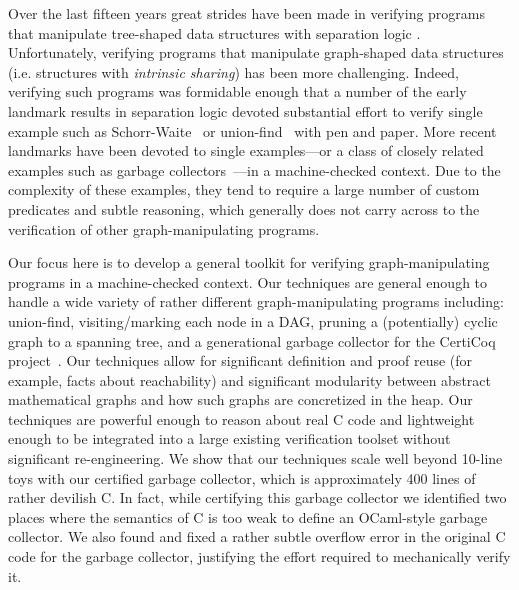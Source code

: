 Over the last fifteen years great strides have been made in verifying programs that manipulate
tree-shaped data structures with separation logic
\cite{berdine:smallfoot,chin:hipsleek,jacobs:verifast,chlipala:bedrock,bengtson:charge,appel:programlogics}.  Unfortunately, verifying programs that manipulate graph-shaped data structures (i.e. structures with \emph{intrinsic sharing}) has been more challenging.  Indeed, verifying such programs was formidable enough that a number of the early landmark results in separation logic devoted substantial effort to verify single example such as Schorr-Waite~\cite{hongseok:phd} or union-find~\cite{NeelThesis} with pen and paper.  More recent landmarks have been devoted to single examples---or a class of closely related examples such as garbage collectors~\cite{A,CakeMLGC,C}---in a machine-checked context.
Due to the complexity of these examples, they tend to require a large number of custom predicates and subtle reasoning, which generally does not carry across to the verification of other graph-manipulating programs.

Our focus here is to develop a general toolkit for verifying graph-manipulating programs in a machine-checked context.  Our techniques are general enough to handle a wide variety of rather different graph-manipulating programs including: union-find, visiting/marking each node in a DAG, pruning a (potentially) cyclic graph to a spanning tree, and a generational garbage collector for the CertiCoq project~\cite{blah}.  Our techniques allow for significant definition and proof reuse (for example, facts about reachability) and significant modularity between abstract mathematical graphs and how such graphs are concretized in the heap.  Our techniques are powerful enough to reason about real C code and lightweight enough to be integrated into a large existing verification toolset without significant re-engineering.  We show that our techniques scale well beyond 10-line toys with our certified garbage collector, which is approximately 400 lines of rather devilish C.  In fact, while certifying this garbage collector we identified two places where the semantics of C is too weak to define an OCaml-style garbage collector.  We also found and fixed a rather subtle overflow error in the original C code for the garbage collector, justifying the effort required to mechanically verify it.

